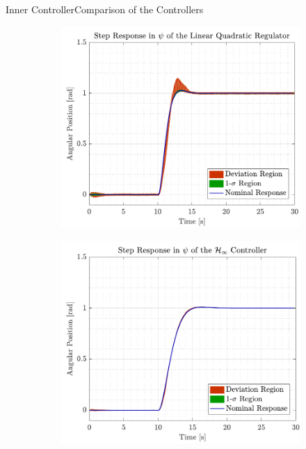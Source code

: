 \begin{frame}{Inner Controller}{Comparison of the Controllers}
  \begin{figure}[H]
    \begin{minipage}{0.45\linewidth}
      \begin{figure}[H]
        \centering
        \includegraphics[width=1\linewidth]{figures/yaw_mc_lqr}
      \end{figure}        
    \end{minipage}\hfill      
    \begin{minipage}{0.45\linewidth}
      \begin{figure}[H]
        \centering
        \includegraphics[width=1\linewidth]{figures/yaw_mc_rob}
      \end{figure}                
    \end{minipage}\hfill \\
  \end{figure}
\end{frame}



